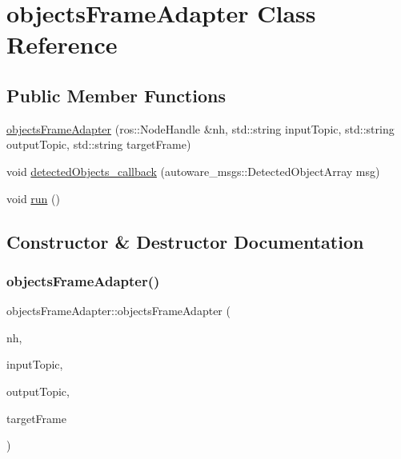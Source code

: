 \hypertarget{classobjectsFrameAdapter}{}\section{objects\+Frame\+Adapter Class Reference}
\label{classobjectsFrameAdapter}
\subsection*{Public Member Functions}
\begin{DoxyCompactItemize}
\item 
\hyperlink{classobjectsFrameAdapter_a2ec60d2e83efaac2ec2f8a5da89b760d}{objects\+Frame\+Adapter} (ros\+::\+Node\+Handle \&nh, std\+::string input\+Topic, std\+::string output\+Topic, std\+::string target\+Frame)
\item 
void \hyperlink{classobjectsFrameAdapter_acb4faa4bfc31edcdf2bce366f2f18fb3}{detected\+Objects\+\_\+callback} (autoware\+\_\+msgs\+::\+Detected\+Object\+Array msg)
\item 
void \hyperlink{classobjectsFrameAdapter_a20db2f4261d72f1d5d9e360c78e07791}{run} ()
\end{DoxyCompactItemize}


\subsection{Constructor \& Destructor Documentation}
\mbox{\label{classobjectsFrameAdapter_a2ec60d2e83efaac2ec2f8a5da89b760d}} 
\subsubsection{\texorpdfstring{objects\+Frame\+Adapter()}{objectsFrameAdapter()}}
{\footnotesize\ttfamily objects\+Frame\+Adapter\+::objects\+Frame\+Adapter (\begin{DoxyParamCaption}\item[{ros\+::\+Node\+Handle \&}]{nh,  }\item[{std\+::string}]{input\+Topic,  }\item[{std\+::string}]{output\+Topic,  }\item[{std\+::string}]{target\+Frame }\end{DoxyParamCaption})\hspace{0.3cm}{\ttfamily [inline]}}



